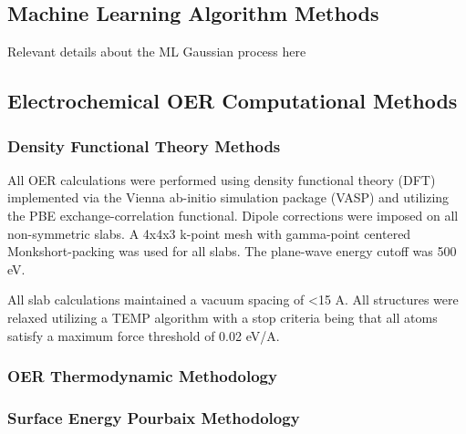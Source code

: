 

\subsection{Machine Learning Algorithm Methods}

Relevant details about the ML Gaussian process here %

\subsection{Electrochemical OER Computational Methods}

\subsubsection{Density Functional Theory Methods}
All OER calculations were performed using density functional theory (DFT) implemented via the Vienna ab-initio simulation package (VASP) and utilizing the PBE exchange-correlation functional.
Dipole corrections were imposed on all non-symmetric slabs.
A 4x4x3 k-point mesh with gamma-point centered Monkshort-packing was used for all slabs.
The plane-wave energy cutoff was 500 eV.


All slab calculations maintained a vacuum spacing of <15 A.
All structures were relaxed utilizing a TEMP algorithm with a stop criteria being that all atoms satisfy a maximum force threshold of 0.02 eV/A.

\subsubsection{OER Thermodynamic Methodology}

\subsubsection{Surface Energy Pourbaix Methodology}

